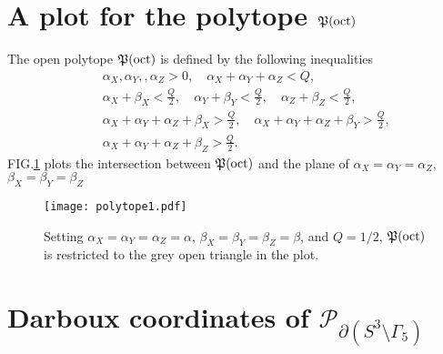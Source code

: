 \documentclass[aps,prd,notitlepage,nofootinbib,superscriptaddress,groupedaddress,twocolumn]{revtex4-1}
\def\be{\begin{eqnarray}}
\def\ee{\end{eqnarray}}
\newcommand{\calp}{\mathcal P}
\newcommand{\cs}{\mathcal S}
\renewcommand{\a}{\alpha}
\renewcommand{\b}{\beta}
\newcommand{\G}{\Gamma}
\begin{document}
\section{A plot for the polytope $\mathfrak{P}(\mathrm{oct})$}\label{A plot for the polytope}

The open polytope $\mathfrak{P}(\mathrm{oct})$ is defined by the following inequalities
\be
&&\a_{X},\a_{Y},,\a_{Z}>0,\quad \a_X+\a_Y+\a_Z<Q,\nonumber\\
&&\a_{X}+\b_{X}<\frac{Q}{2},\quad \a_{Y}+\b_{Y}<\frac{Q}{2},\quad \a_{Z}+\b_{Z}<\frac{Q}{2}, \nonumber\\
&& \a_{X}+\a_{Y}+\a_Z+\b_X>\frac{Q}{2},\quad \a_{X}+\a_{Y}+\a_Z+\b_Y>\frac{Q}{2},\nonumber\\
&&\a_{X}+\a_{Y}+\a_Z+\b_Z>\frac{Q}{2}.\nonumber
\ee 
FIG.\ref{polytope} plots the intersection between $\mathfrak{P}(\mathrm{oct})$ and the plane of $\a_X=\a_Y=\a_Z$, $\b_X=\b_Y=\b_Z$


\begin{figure}[h]
	\begin{center}
	\texttt{[image: polytope1.pdf]}
	\caption{Setting $\a_X=\a_Y=\a_Z=\a$, $\b_X=\b_Y=\b_Z=\b$, and $Q=1/2$, $\mathfrak{P}(\mathrm{oct})$ is restricted to the grey open triangle in the plot. }
	\label{polytope}
	\end{center}
\end{figure}




\section{Darboux coordinates of $\calp_{\partial(S^3\setminus\G_5)}$}\label{Darboux coordinates of P}

\end{document}
